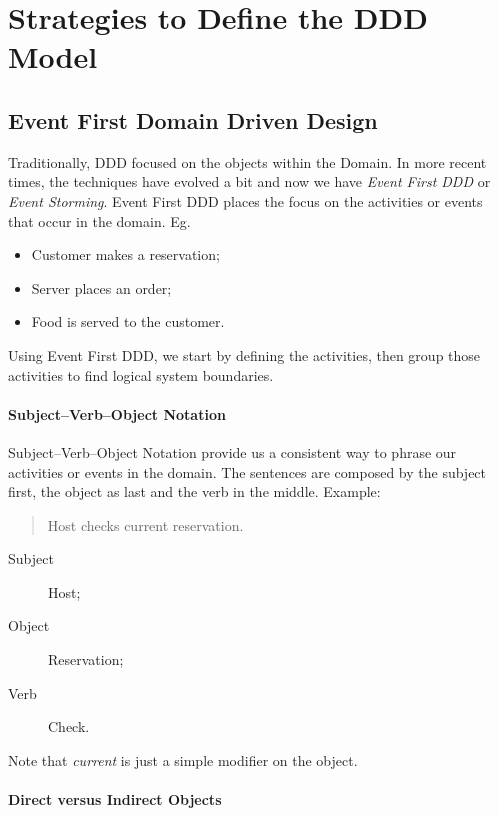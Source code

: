 \section{Strategies to Define the DDD Model}

\subsection{Event First Domain Driven Design}

Traditionally, DDD focused on the objects within the Domain. In more recent times, the techniques have evolved a bit and now we have \emph{Event First DDD} or \emph{Event Storming}. Event First DDD places the focus on the activities or events that occur in the domain. Eg.
\begin{itemize}
    \item Customer makes a reservation;
    \item Server places an order;
    \item Food is served to the customer.
\end{itemize}

Using Event First DDD, we start by defining the activities, then group those activities to find logical system boundaries.

\paragraph{Subject--Verb--Object Notation}
Subject--Verb--Object Notation provide us a consistent way to phrase our activities or events in the domain.
The sentences are composed by the subject first, the object as last and the verb in the middle. Example:

\begin{quote}
    Host checks current reservation.
\end{quote}
\begin{description}
    \item[Subject] Host;
    \item[Object] Reservation;
    \item[Verb] Check.
\end{description}

Note that \emph{current} is just a simple modifier on the object.

\paragraph{Direct versus Indirect Objects}

